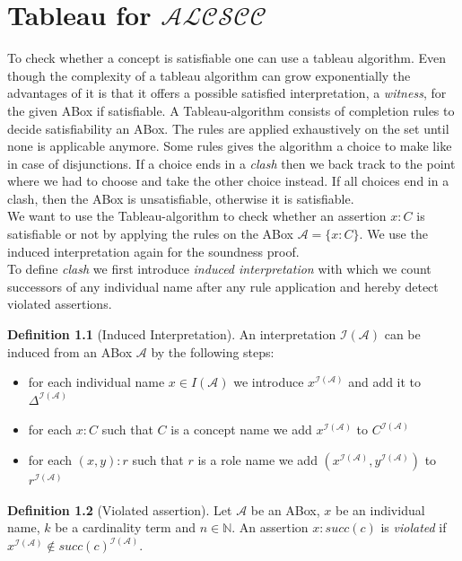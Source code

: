 \documentclass{book}
\theoremstyle{break}
\theoremstyle{definition}
\newtheorem{mydef}{Definition}
\begin{document}
\chapter{Tableau for $\mathcal{ALCSCC}$}
To check whether a concept is satisfiable one can use a tableau algorithm. Even though the complexity of a tableau algorithm can grow exponentially the advantages of it is that it offers a possible satisfied interpretation, a \textit{witness}, for the given ABox if satisfiable. A Tableau-algorithm consists of completion rules to decide satisfiability an ABox. The rules are applied exhaustively on the set until none is applicable anymore. Some rules gives the algorithm a choice to make like in case of disjunctions. If a choice ends in a \textit{clash} then we back track to the point where we had to choose and take the other choice instead. If all choices end in a clash, then the ABox is unsatisfiable, otherwise it is satisfiable.\\
We want to use the Tableau-algorithm to check whether an assertion $x:C$ is satisfiable or not by applying the rules on the ABox $\mathcal{A}=\{x:C\}$. We use the induced interpretation again for the soundness proof.\\
To define \textit{clash} we first introduce \textit{induced interpretation} with which we count successors of any individual name after any rule application and hereby detect violated assertions.
\begin{mydef}[Induced Interpretation]
An interpretation $\mathcal{I}(\mathcal{A})$ can be induced from an ABox $\mathcal{A}$ by the following steps:
\begin{itemize}
\item for each individual name $x\in I(\mathcal{A})$ we introduce $x^{\mathcal{I}(\mathcal{A})}$ and add it to $\Delta^{\mathcal{I}(\mathcal{A})}$
\item for each $x:C$ such that $C$ is a concept name we add $x^{\mathcal{I}(\mathcal{A})}$ to $C^{\mathcal{I}(\mathcal{A})}$
\item for each $(x,y):r$ such that $r$ is a role name we add $(x^{\mathcal{I}(\mathcal{A})},y^{\mathcal{I}(\mathcal{A})})$ to $r^{\mathcal{I}(\mathcal{A})}$
\end{itemize}
\end{mydef}
\begin{mydef}[Violated assertion]
Let $\mathcal{A}$ be an ABox, $x$ be an individual name, $k$ be a cardinality term and $n\in\mathbb{N}$. An assertion $x:succ(c)$ is \textit{violated} if $x^{\mathcal{I}(\mathcal{A})}\notin succ(c)^{\mathcal{I}(\mathcal{A})}$.
\end{mydef}
\end{document}

